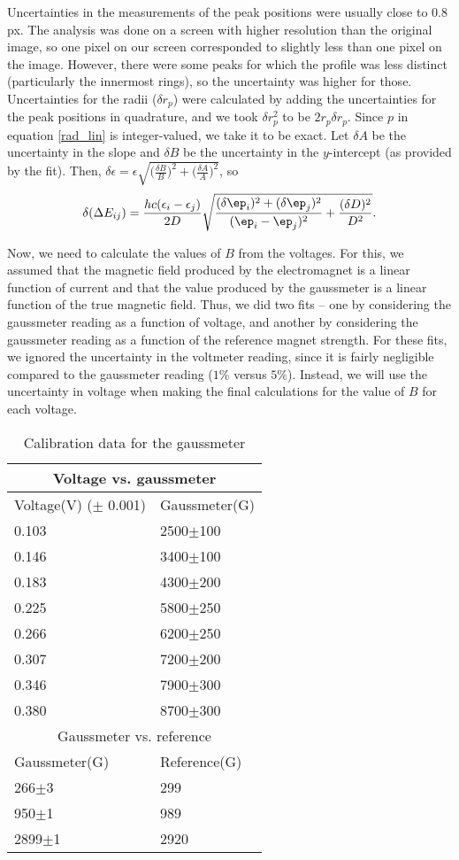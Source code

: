 \documentclass{amsart}
\begin{document}
Uncertainties in the measurements of the peak positions were usually close to $0.8$px. The analysis was done on a screen with higher resolution than the original image, so one pixel on our screen corresponded to slightly less than one pixel on the image. However, there were some peaks for which the profile was less distinct (particularly the innermost rings), so the uncertainty was higher for those. Uncertainties for the radii ($\delta r_p$) were calculated by adding the uncertainties for the peak positions in quadrature, and we took $\delta r_p^2$ to be $2r_p\delta r_p$. Since $p$ in equation \ref{rad_lin} is integer-valued, we take it to be exact. Let $\delta A$ be the uncertainty in the slope and $\delta B$ be the uncertainty in the $y$-intercept (as provided by the fit). Then, $\delta\epsilon=\epsilon\sqrt{\big(\frac{\delta B}{B}\big)^2+\big(\frac{\delta A}{A}\big)^2}$, so $$\delta (\Delta E_{ij})=\frac{h c(\epsilon_i-\epsilon_j)}{2D}\sqrt{\frac{(\delta\ep_i)^2+(\delta\ep_j)^2}{(\ep_i-\ep_j)^2}+\frac{(\delta D)^2}{D^2}}\text{.}$$ 

Now, we need to calculate the values of $B$ from the voltages. For this, we assumed that the magnetic field produced by the electromagnet is a linear function of current and that the value produced by the gaussmeter is a linear function of the true magnetic field. Thus, we did two fits -- one by considering the gaussmeter reading as a function of voltage, and another by considering the gaussmeter reading as a function of the reference magnet strength. For these fits, we ignored the uncertainty in the voltmeter reading, since it is fairly negligible compared to the gaussmeter reading ($1$\% versus $5$\%). Instead, we will use the uncertainty in voltage when making the final calculations for the value of $B$ for each voltage.

\begin{wraptable}{r}{21em}
\vspace{-20pt}
\begin{tabular}[t]{|l|l|}
\hline
\multicolumn{2}{|c|}{Voltage vs. gaussmeter}\\
\hline
Voltage(V) ($\pm$ 0.001)& Gaussmeter(G)\\
0.103 & 2500$\pm$100\\
0.146 & 3400$\pm$100\\
0.183 & 4300$\pm$200\\
0.225 & 5800$\pm$250\\
0.266 & 6200$\pm$250\\
0.307 & 7200$\pm$200\\
0.346 & 7900$\pm$300\\
0.380 & 8700$\pm$300\\
\hline
\multicolumn{2}{|c|}{Gaussmeter vs. reference}\\
\hline
Gaussmeter(G) & Reference(G)\\
266$\pm$3 & 299\\
950$\pm$1 & 989\\
2899$\pm$1 & 2920\\
\hline
\end{tabular}
\caption{Calibration data for the gaussmeter}
\end{wraptable}
\end{document}
